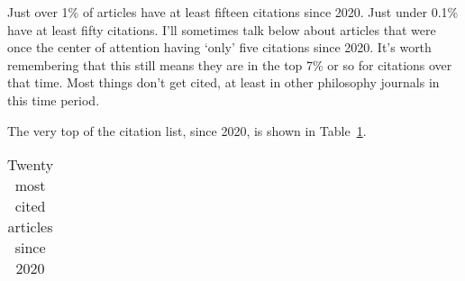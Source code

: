 \documentclass[
  10pt,
  letterpaper,
  DIV=11,
  numbers=noendperiod,
  twoside]{scrartcl}
\begin{document}
Just over 1\% of articles have at least fifteen citations since 2020.
Just under 0.1\% have at least fifty citations. I'll sometimes talk
below about articles that were once the center of attention having
`only' five citations since 2020. It's worth remembering that this still
means they are in the top 7\% or so for citations over that time. Most
things don't get cited, at least in other philosophy journals in this
time period.

The very top of the citation list, since 2020, is shown in
Table~\ref{tbl-recent-high-cite}.

\begin{longtable}[]{@{}
  >{\raggedleft\arraybackslash}p{}
  >{\raggedright\arraybackslash}p{}@{}}

\caption{\label{tbl-recent-high-cite}Twenty most cited articles since
2020}

\tabularnewline


\end{longtable}
\end{document}
